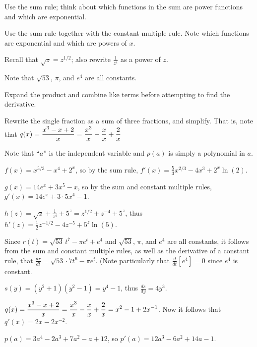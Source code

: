 \begin{bighint}
\ba
	  \item Use the sum rule; think about which functions in the sum are power functions and which are exponential.
	  \item Use the sum rule together with the constant multiple rule.  Note which functions are exponential and which are powers of $x$.
	  \item Recall that $\sqrt{z} = z^{1/2}$; also rewrite $\frac{1}{z^4}$ as a power of $z$.
	  \item Note that $\sqrt{53}$, $\pi$, and $e^4$ are all constants.
	  \item Expand the product and combine like terms before attempting to find the derivative.
	  \item Rewrite the single fraction as a sum of three fractions, and simplify.  That is, note that $q(x) = \displaystyle \frac{x^3 - x + 2}{x} = \displaystyle \frac{x^3}{x} - \frac{x}{x} + \frac{2}{x}$
	  \item Note that ``$a$'' is the independent variable and $p(a)$ is simply a polynomial in $a$.
\ea
\end{bighint}
\begin{activitySolution}
\ba
	  \item $f(x) = x^{5/3} - x^4 + 2^x$, so by the sum rule, $f'(x) = \frac{5}{3}x^{2/3} - 4 x^3 + 2^x \ln(2).$
	  \item $g(x) = 14e^x + 3x^5 - x$, so by the sum and constant multiple rules, $g'(x) = 14e^x + 3 \cdot 5x^4 - 1$.
	  \item $h(z) = \sqrt{z} + \frac{1}{z^4} + 5^z = z^{1/2} + z^{-4} + 5^z$, thus $h'(z) = \frac{1}{2}z^{-1/2} - 4z^{-5} + 5^z \ln(5)$.
	  \item Since $r(t) = \sqrt{53} \, t^7 - \pi e^t + e^4$ and $\sqrt{53}$, $\pi$, and $e^4$ are all constants, it follows from the sum and constant multiple rules, as well as the derivative of a constant rule, that $\frac{dr}{dt} = \sqrt{53} \cdot 7 t^6 - \pi e^t$.  (Note particularly that $\frac{d}{dt}[e^4] = 0$ since $e^4$ is constant.
	  \item $s(y) = (y^2 + 1)(y^2 - 1)= y^4 - 1$, thus $\frac{ds}{dy} = 4y^3$.
	  \item $q(x) = \displaystyle \frac{x^3 - x + 2}{x} = \displaystyle \frac{x^3}{x} - \frac{x}{x} + \frac{2}{x} = x^2 - 1 + 2x^{-1}$.  Now it follows that $q'(x) = 2x - 2x^{-2}$.
	  \item $p(a) = 3a^4 - 2a^3 + 7a^2 - a + 12$, so $p'(a) = 12a^3 - 6 a^2 + 14a - 1.$
\ea
\end{activitySolution}
\aftera